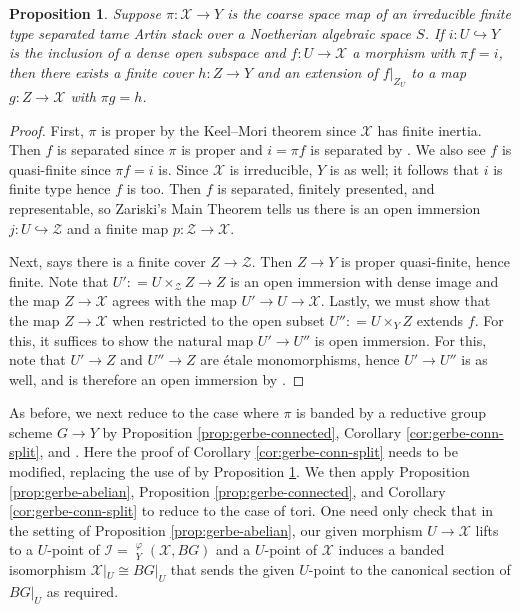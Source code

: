 \documentclass{amsart}
\newtheorem{proposition}[proposition]{Proposition}
\theoremstyle{definition}
\newcommand{\cZ}{\mathcal{Z}}
\newcommand{\cX}{\mathcal{X}}
\newcommand{\sI}{\mathscr{I}}
\DeclareMathOperator{\Isom}{Isom}
\DeclareMathOperator{\uIsom}{\underline{\Isom}}
\begin{document}
	\begin{proposition}\label{prop:tame-DM-proper-generic-splitting-extension}
		Suppose $\pi\colon\cX\to Y$ is the coarse space map of an irreducible finite type separated tame Artin stack over a Noetherian algebraic space $S$.  
		If $i\colon U\hookrightarrow Y$ is the inclusion of a dense open subspace and $f\colon U\to\cX$ a morphism with $\pi f=i$, then there exists a finite cover $h\colon Z\to Y$ and an extension of $f|_{Z_U}$ to a map $g\colon Z\to\cX$ with $\pi g=h$.
	\end{proposition}
	\begin{proof}
		First, $\pi$ is proper by the Keel--Mori theorem since $\cX$ has finite inertia. Then $f$ is separated since $\pi$ is proper and $i=\pi f$ is separated by \cite[Tag 01L7]{stacks-project}. We also see $f$ is quasi-finite since $\pi f=i$ is. Since $\cX$ is irreducible, $Y$ is as well; it follows that $i$ is finite type hence $f$ is too. Then $f$ is separated, finitely presented, and representable, so Zariski's Main Theorem \cite[Theorem 16.5]{LMB} tells us there is an open immersion $j\colon U\hookrightarrow\cZ$ and a finite map $p\colon\cZ\to\cX$.
		
		Next, \cite[Theorem 2.7]{EHKV} says there is a finite cover $Z\to\cZ$. Then $Z\to Y$ is proper quasi-finite, hence finite. Note that $U'\colon=U\times_\cZ Z\to Z$ is an open immersion with dense image and the map $Z\to\cX$ agrees with the map $U'\to U\to\cX$. Lastly, we must show that the map $Z\to\cX$ when restricted to the open subset $U''\colon=U\times_Y Z$ extends $f$. For this, it suffices to show the natural map $U'\to U''$ is open immersion. For this, note that $U'\to Z$ and $U''\to Z$ are \'etale monomorphisms, hence $U'\to U''$ is as well, and is therefore an open immersion by \cite[Tag 025G]{stacks-project}.
	\end{proof}
	
	As before, we next reduce to the case where $\pi$ is banded by a reductive group scheme $G\to Y$ by Proposition \ref{prop:gerbe-connected}, Corollary \ref{cor:gerbe-conn-split}, and \cite[Ch.~V, sect.~3.2, p.~75]{Douai}. Here the proof of Corollary \ref{cor:gerbe-conn-split} needs to be modified, replacing the use of \cite[Theorem 2.7]{EHKV} by Proposition \ref{prop:tame-DM-proper-generic-splitting-extension}. We then apply Proposition \ref{prop:gerbe-abelian}, Proposition \ref{prop:gerbe-connected}, and Corollary \ref{cor:gerbe-conn-split} to reduce to the case of tori. One need only check that in the setting of Proposition \ref{prop:gerbe-abelian}, our given morphism $U \to \cX$ lifts to a $U$-point of $\sI = \uIsom_Y^{\varphi}(\cX, BG)$ and a $U$-point of $\cX$ induces a banded isomorphism $\cX|_U \cong BG|_U$ that sends the given $U$-point to the canonical section of $BG|_U$ as required. 
	
\end{document}

